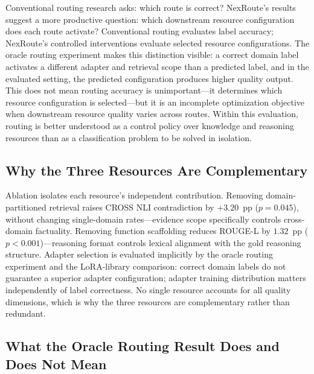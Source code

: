 \documentclass[a4paper,fleql,doubleblind]{cas-sc}
\begin{document}
Conventional routing research asks: which route is correct?
NexRoute's results suggest a more productive question: which downstream resource
configuration does each route activate?
Conventional routing evaluates label accuracy; NexRoute's controlled interventions
evaluate selected resource configurations.
The oracle routing experiment makes this distinction visible: a correct domain label
activates a different adapter and retrieval scope than a predicted label, and in the
evaluated setting, the predicted configuration produces higher quality output.
This does not mean routing accuracy is unimportant---it determines which resource
configuration is selected---but it is an incomplete optimization objective when
downstream resource quality varies across routes.
Within this evaluation, routing is better understood as a control policy over knowledge
and reasoning resources than as a classification problem to be solved in isolation.

\subsection{Why the Three Resources Are Complementary}

Ablation isolates each resource's independent contribution.
Removing domain-partitioned retrieval raises CROSS NLI contradiction by $+3.20$~pp
($p{=}0.045$), without changing single-domain rates---evidence scope specifically
controls cross-domain factuality.
Removing function scaffolding reduces ROUGE-L by $1.32$~pp ($p{<}0.001$)---reasoning
format controls lexical alignment with the gold reasoning structure.
Adapter selection is evaluated implicitly by the oracle routing experiment and the
LoRA-library comparison: correct domain labels do not guarantee a superior adapter
configuration; adapter training distribution matters independently of label correctness.
No single resource accounts for all quality dimensions, which is why the three resources
are complementary rather than redundant.

\subsection{What the Oracle Routing Result Does and Does Not Mean}
\end{document}
